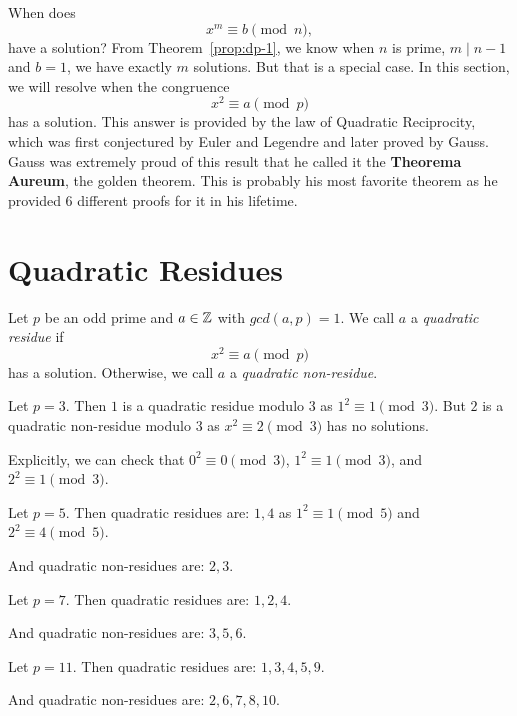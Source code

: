 When does \[x^m \equiv b \pmod{n},\] have a solution? From Theorem~\ref{prop:dp-1}, we know when $n$ is prime, $m \mid n-1$ and $b=1$, we have exactly $m$ solutions. But that is a special case. In this section, we will resolve when the congruence \[x^2 \equiv a \pmod{p}\] has a solution. This answer is provided by the law of Quadratic Reciprocity, which was first conjectured by Euler and Legendre and later proved by Gauss. Gauss was extremely proud of this result that he called it the \textbf{Theorema Aureum}, the golden theorem. This is probably his most favorite theorem as he provided 6 different proofs for it in his lifetime.

\section{Quadratic Residues}
\begin{definition}
    Let $p$ be an odd prime and $a \in \mathbb{Z}$ with $gcd(a,p)=1$. We call $a$ a \textit{quadratic residue} if \[x^2 \equiv a \pmod{p}\] has a solution. Otherwise, we call $a$ a \textit{quadratic non-residue}.
\end{definition}

\begin{eg}
    Let $p=3$. Then $1$ is a quadratic residue modulo $3$ as $1^2 \equiv 1 \pmod{3}$. But $2$ is a quadratic non-residue modulo $3$ as $x^2 \equiv 2 \pmod{3}$ has no solutions.

    Explicitly, we can check that $0^2 \equiv 0 \pmod{3}$, $1^2 \equiv 1 \pmod{3}$, and $2^2 \equiv 1 \pmod{3}$.
\end{eg}

\begin{eg}
    Let $p=5$. Then quadratic residues are: $1, 4$ as $1^2 \equiv 1 \pmod{5}$ and $2^2 \equiv 4 \pmod{5}$.

    And quadratic non-residues are: $2, 3$.
\end{eg}

\begin{eg}
    Let $p=7$. Then quadratic residues are: $1, 2, 4$.

    And quadratic non-residues are: $3, 5, 6$.
\end{eg}

\begin{eg}
    Let $p=11$. Then quadratic residues are: $1, 3, 4, 5, 9$.

    And quadratic non-residues are: $2, 6, 7, 8, 10$.
\end{eg}


